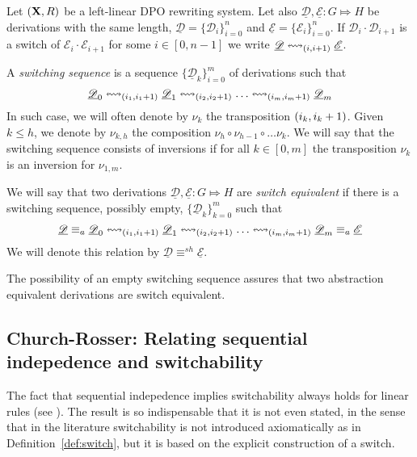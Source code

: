 \documentclass[a4paper,UKenglish,cleveref,pdftex,thm-restate,numberwithinsect,anonymous]{lipics}
\newcommand{\interval}[2][1]{\ensuremath{[{#1},{#2}]}}
\def\R{\mathsf{R}}
\def\X{\textbf {\textup{X}}}
\newcommand{\dder}[1]{\mathscr{#1}}
\newcommand{\der}[1]{\underline{\dder{#1}}}
\newcommand{\shift}[1]{\ensuremath{\mathrel{{\leftrightsquigarrow}_{#1}}}}
\begin{document}
\begin{definition}
  \label{de:switch-equivalence}
  Let $(\X, \R)$ be a left-linear DPO rewriting system.  Let also
  $\der{D}, \der{E} : G \Mapsto H$ be derivations with the same
  length, $\der{D}=\{\dder{D}_{i}\}_{i=0}^n$ and
  $\der{E}=\{\dder{E}_{i}\}_{i=0}^n$. If
  $\dder{D}_i \cdot \dder{D}_{i+1}$ is a switch of
  $\dder{E}_i \cdot \dder{E}_{i+1}$ for some $i \in [0,n-1]$ we write
  $\der{D} \shift{\transp{i}} \der{E}$. 
  
  A \emph{switching sequence} is  a sequence $\{\der{D}_{k}\}_{i=0}^m$ of derivations such that 
  \[\der{D}_0 \shift{\transp{i_1}} \der{D}_1 \shift{\transp{i_2}} \ldots \shift{\transp{i_m}}
  \der{D}_m\]
 In such case, we will often denote by $\nu_{k}$ the transposition $\transp{i_k}$. Given $k \leq h$,
 we denote by $\nu_{k,h}$ the composition
 $\nu_h \circ \nu_{h-1} \circ \ldots \nu_k$. We will say that the
 switching sequence consists of inversions if for all
 $k \in \interval[0]{m}$ the transposition $\nu_k$ is an inversion for
 $\nu_{1,m}$.
  
  We will say that two derivations $\der{D}, \der{E}:G\Mapsto H$ are \emph{switch
    equivalent} if there is a switching sequence, possibly empty, $\{\der{D}_{k}\}_{k=0}^m$ such that
      \[\der{D}\equiv_a \der{D}_0 \shift{\transp{i_1}} \der{D}_1 \shift{\transp{i_2}} \ldots \shift{\transp{i_m}}
    \der{D}_m\equiv _a \der{E}\]
    We will denote this relation by $\der{D}\equiv^{sh} \der{E}$. 
\end{definition}

\begin{remark}\label{rem:abst}
	The possibility of an empty switching sequence assures that two abstraction equivalent derivations are switch equivalent.
\end{remark}


\subsection{Church-Rosser: Relating sequential indepedence and switchability}\label{subsec:CR}


The fact that sequential indepedence implies switchability always
holds for linear rules (see ). The result is so
indispensable that it is not even stated, in the sense that
in the literature switchability is not introduced axiomatically as in
Definition~\ref{def:switch}, but it is based on the explicit
construction of a switch.
\end{document}
